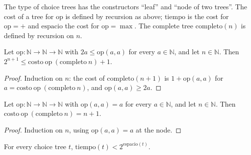 \begin{definition}
  \label{def:dynamics-arbol}
  \leanok
  The type of choice trees has the constructors ``leaf'' and ``node of two trees''. The cost of a
  tree for $\mathrm{op}$ is defined by recursion as above; $\mathrm{tiempo}$ is the cost for
  $\mathrm{op} = +$ and $\mathrm{espacio}$ the cost for $\mathrm{op} = \max$. The complete tree
  $\mathrm{completo}(n)$ is defined by recursion on $n$.
  \own{}
\end{definition}

\begin{theorem}
  \label{thm:dynamics-cost-additive}
  \leanok
  Let $\mathrm{op} : \mathbb{N} \to \mathbb{N} \to \mathbb{N}$ with $2a \le \mathrm{op}(a,a)$ for
  every $a \in \mathbb{N}$, and let $n \in \mathbb{N}$. Then
  $2^{n+1} \le \mathrm{costo}\ \mathrm{op}\ (\mathrm{completo}\ n) + 1$.
  \own{}
\end{theorem}

\begin{proof}
  \leanok
  Induction on $n$: the cost of $\mathrm{completo}(n+1)$ is $1 + \mathrm{op}(a, a)$ for
  $a = \mathrm{costo}\ \mathrm{op}\ (\mathrm{completo}\ n)$, and $\mathrm{op}(a,a) \ge 2a$.
\end{proof}

\begin{theorem}
  \label{thm:dynamics-cost-idempotent}
  \leanok
  Let $\mathrm{op} : \mathbb{N} \to \mathbb{N} \to \mathbb{N}$ with $\mathrm{op}(a,a) = a$ for every
  $a \in \mathbb{N}$, and let $n \in \mathbb{N}$. Then
  $\mathrm{costo}\ \mathrm{op}\ (\mathrm{completo}\ n) = n + 1$.
  \own{}
\end{theorem}

\begin{proof}
  \leanok
  Induction on $n$, using $\mathrm{op}(a,a) = a$ at the node.
\end{proof}

\begin{theorem}
  \label{thm:dynamics-time-space}
  \leanok
  For every choice tree $t$, $\mathrm{tiempo}(t) < 2^{\mathrm{espacio}(t)}$.
  \own{}
\end{theorem}

